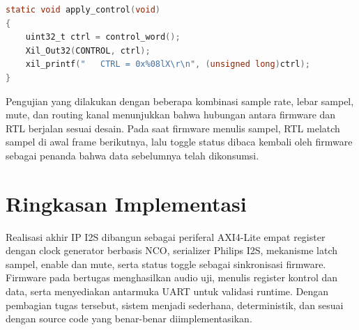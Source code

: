 \begin{lstlisting}[language=C,caption={Pengiriman control word ke hardware dan echo ke UART.},label={lst:ch4-apply-control}]
static void apply_control(void)
{
    uint32_t ctrl = control_word();
    Xil_Out32(CONTROL, ctrl);
    xil_printf("   CTRL = 0x%08lX\r\n", (unsigned long)ctrl);
}
\end{lstlisting}

Pengujian yang dilakukan dengan beberapa kombinasi sample rate, lebar sampel, mute, dan routing kanal menunjukkan bahwa hubungan antara firmware dan RTL berjalan sesuai desain. Pada saat firmware menulis sampel, RTL melatch sampel di awal frame berikutnya, lalu toggle status dibaca kembali oleh firmware sebagai penanda bahwa data sebelumnya telah dikonsumsi.

\section{Ringkasan Implementasi}

Realisasi akhir IP I2S dibangun sebagai periferal AXI4-Lite empat register dengan clock generator berbasis NCO, serializer Philips I2S, mekanisme latch sampel, enable dan mute, serta status toggle sebagai sinkronisasi firmware. Firmware pada  bertugas menghasilkan audio uji, menulis register kontrol dan data, serta menyediakan antarmuka UART untuk validasi runtime. Dengan pembagian tugas tersebut, sistem menjadi sederhana, deterministik, dan sesuai dengan source code yang benar-benar diimplementasikan.

